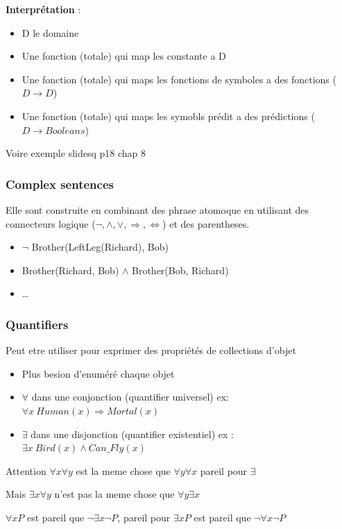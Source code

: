 \documentclass[12pt]{article}
\begin{document}
		\textbf{Interprétation} : 
		\begin{itemize}
			\item D le domaine
			\item Une fonction (totale) qui map les constante a D
			\item Une fonction (totale) qui maps les fonctions de symboles a des fonctions ($D \rightarrow D$)
			\item Une fonction (totale) qui maps les symobls prédit a des prédictions ($D \rightarrow Booleans$)
		\end{itemize}
		
		Voire exemple slidesq p18 chap 8
		
		\subsubsection{Complex sentences}
			Elle sont construite en combinant des phrase atomoque en utilisant des connecteurs logique ($\neg, \land, \lor, \Rightarrow, \Leftrightarrow$) et des parentheses.
			\begin{itemize}
				\item $ \neg$ Brother(LeftLeg(Richard), Bob)
				\item Brother(Richard, Bob) $\land$ Brother(Bob, Richard)
				\item \dots
			\end{itemize}
			
		\subsubsection{Quantifiers}
			Peut etre utiliser pour exprimer des propriétés de collections d'objet
			\begin{itemize}
				\item Plus besion d'enuméré chaque objet
				\item $\forall$ dans une conjonction (quantifier universel) ex: $\forall x \ Human(x)\Rightarrow Mortal(x)$
				\item $\exists$ dans une disjonction (quantifier existentiel) ex : $\exists x \ Bird(x) \land Can\_Fly(x)$
			\end{itemize}	
			
			Attention $\forall x \forall y$ est la meme chose que $\forall y \forall x$ pareil pour $\exists$
			
			Mais $\exists x \forall y $ n'est pas la meme chose que $\forall y \exists x$  
			
			$\forall x P$ est pareil que $\neg \exists x \neg P$, pareil pour $\exists x P$ est pareil que $\neg \forall x \neg P$
			
\end{document}
